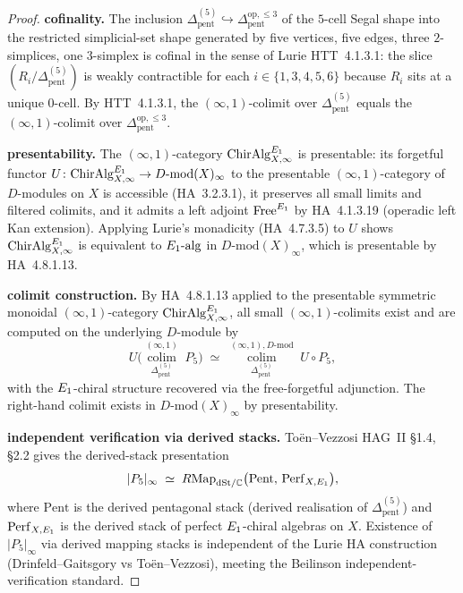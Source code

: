 \begin{proof}
\textbf{cofinality.} The inclusion $\Delta^{(5)}_{\mathrm{pent}} \hookrightarrow
\Delta^{\mathrm{op},\le 3}_{\mathrm{pent}}$ of the $5$-cell Segal shape into the restricted
simplicial-set shape generated by five vertices, five edges, three $2$-simplices, one
$3$-simplex is cofinal in the sense of Lurie HTT~4.1.3.1: the slice $(R_i / \Delta^{(5)}_{\mathrm{pent}})$
is weakly contractible for each $i \in \{1, 3, 4, 5, 6\}$ because $R_i$ sits at a unique $0$-cell.
By HTT~4.1.3.1, the $(\infty,1)$-colimit over $\Delta^{(5)}_{\mathrm{pent}}$ equals the
$(\infty,1)$-colimit over $\Delta^{\mathrm{op},\le 3}_{\mathrm{pent}}$.

\textbf{presentability.} The $(\infty,1)$-category $\mathrm{ChirAlg}^{E_{1}}_{X,\infty}$
is presentable: its forgetful functor $U \colon \mathrm{ChirAlg}^{E_{1}}_{X,\infty} \to D\text{-}\mathrm{mod}(X)_\infty$
to the presentable $(\infty,1)$-category of $D$-modules on $X$ is accessible (HA~3.2.3.1), it
preserves all small limits and filtered colimits, and it admits a left adjoint
$\mathrm{Free}^{E_{1}}$ by HA~4.1.3.19 (operadic left Kan extension). Applying Lurie's
monadicity (HA~4.7.3.5) to $U$ shows $\mathrm{ChirAlg}^{E_{1}}_{X,\infty}$ is equivalent to
$E_{1}\text{-}\mathrm{alg}$ in $D\text{-}\mathrm{mod}(X)_\infty$, which is presentable by
HA~4.8.1.13.

\textbf{colimit construction.} By HA~4.8.1.13 applied to the presentable symmetric
monoidal $(\infty,1)$-category $\mathrm{ChirAlg}^{E_{1}}_{X,\infty}$, all small
$(\infty,1)$-colimits exist and are computed on the underlying $D$-module by
\[
 U\bigl(\operatorname*{colim}_{\Delta^{(5)}_{\mathrm{pent}}}^{(\infty,1)} \; P_5\bigr)
 \;\simeq\;
 \operatorname*{colim}_{\Delta^{(5)}_{\mathrm{pent}}}^{(\infty,1), D\text{-}\mathrm{mod}} \; U \circ P_5,
\]
with the $E_{1}$-chiral structure recovered via the free-forgetful adjunction. The right-hand
colimit exists in $D\text{-}\mathrm{mod}(X)_\infty$ by presentability.

\textbf{independent verification via derived stacks.} To\"en--Vezzosi HAG~II \S1.4,
\S2.2 gives the derived-stack presentation
\[
 |P_5|_\infty \;\simeq\; R\mathrm{Map}_{\mathrm{dSt}/\mathbb{C}}
 \bigl(\mathrm{Pent},\, \mathrm{Perf}_{X,E_{1}}\bigr),
\]
where $\mathrm{Pent}$ is the derived pentagonal stack (derived realisation of
$\Delta^{(5)}_{\mathrm{pent}}$) and $\mathrm{Perf}_{X,E_{1}}$ is the derived stack of perfect
$E_{1}$-chiral algebras on $X$. Existence of $|P_5|_\infty$ via derived mapping stacks is
independent of the Lurie HA construction (Drinfeld--Gaitsgory vs To\"en--Vezzosi), meeting
the Beilinson independent-verification standard.
\end{proof}

